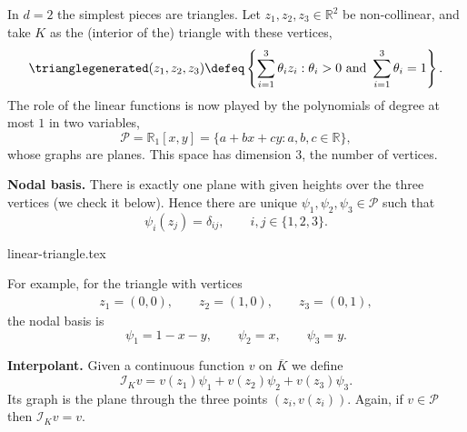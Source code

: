 \begin{example}[The linear Lagrange triangle in $d = 2$]
    \label{ex:Lagrange linear triangle}
    In $d = 2$ the simplest pieces are triangles.
    Let $z_1, z_2, z_3 \in \mathbb R^2$ be non-collinear, and take $K$ as the (interior of the) triangle with these vertices,
    \begin{equation}
        \label{eq:FEM d=2 K triangle}
        \trianglegenerated(z_1,z_2,z_3) \defeq \left\{ \sum_{i=1}^3 \theta_i z_i : \theta_i > 0 \text{ and } \sum_{i=1}^3 \theta_i = 1\right\}.
    \end{equation}
    The role of the linear functions is now played by the polynomials of degree at most $1$ in two variables,
    \begin{equation*}
        \mathcal P = \mathbb R_1[x,y] = \{ a + b x + c y : a, b, c \in \mathbb R \},
    \end{equation*}
    whose graphs are planes. This space has dimension $3$, the number of vertices.

    \medskip
    \noindent\textbf{Nodal basis.}
    There is exactly one plane with given heights over the three vertices (we check it below).
    Hence there are unique $\psi_1, \psi_2, \psi_3 \in \mathcal P$ such that
    \begin{equation*}
        \psi_i(z_j) = \delta_{ij}, \qquad i, j \in \{1, 2, 3\}.
    \end{equation*}
    \begin{center}
        {linear-triangle.tex}
    \end{center}
    For example, for the triangle with vertices
    \begin{align}
        \label{eq:FEM d=2 K triangle corners}
        z_1 = (0,0), \qquad z_2 = (1,0), \qquad z_3 = (0,1),
    \end{align}
    the nodal basis is
    \begin{equation*}
        \psi_1 = 1-x-y, \qquad \psi_2 = x, \qquad \psi_3 = y.
    \end{equation*}

    \medskip
    \noindent\textbf{Interpolant.}
    Given a continuous function $v$ on $\overline K$ we define
    \begin{equation*}
        \mathcal I_K v = v(z_1) \psi_1 + v(z_2) \psi_2 + v(z_3) \psi_3 .
    \end{equation*}
    Its graph is the plane through the three points $(z_i, v(z_i))$.
    Again, if $v \in \mathcal P$ then $\mathcal I_K v = v$.


\end{example}
